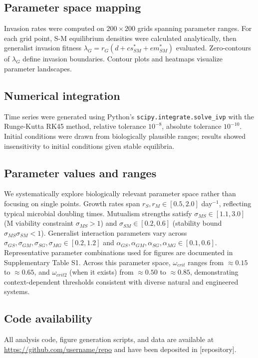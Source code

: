 \documentclass[9pt,twocolumn]{pnas-new}
\begin{document}
\subsection*{Parameter space mapping} Invasion rates were computed on $200 \times 200$ grids spanning parameter ranges. For each grid point, S-M equilibrium densities were calculated analytically, then generalist invasion fitness $\lambda_G = r_G(d + cs^*_{SM} + em^*_{SM})$ evaluated. Zero-contours of $\lambda_G$ define invasion boundaries. Contour plots and heatmaps visualize parameter landscapes.

\subsection*{Numerical integration} Time series were generated using Python's \texttt{scipy.integrate.solve\_ivp} with the Runge-Kutta RK45 method, relative tolerance $10^{-8}$, absolute tolerance $10^{-10}$. Initial conditions were drawn from biologically plausible ranges; results showed insensitivity to initial conditions given stable equilibria.

\subsection*{Parameter values and ranges} We systematically explore biologically relevant parameter space rather than focusing on single points. Growth rates span $r_S, r_M \in [0.5, 2.0]$ day$^{-1}$, reflecting typical microbial doubling times. Mutualism strengths satisfy $\sigma_{MS} \in [1.1, 3.0]$ (M viability constraint $\sigma_{MS} > 1$) and $\sigma_{SM} \in [0.2, 0.6]$ (stability bound $\sigma_{MS}\sigma_{SM} < 1$). Generalist interaction parameters vary across $\sigma_{GS}, \sigma_{GM}, \sigma_{SG}, \sigma_{MG} \in [0.2, 1.2]$ and $\alpha_{GS}, \alpha_{GM}, \alpha_{SG}, \alpha_{MG} \in [0.1, 0.6]$. Representative parameter combinations used for figures are documented in Supplementary Table S1. Across this parameter space, $\omega_{crit}$ ranges from $\approx 0.15$ to $\approx 0.65$, and $\omega_{crit2}$ (when it exists) from $\approx 0.50$ to $\approx 0.85$, demonstrating context-dependent thresholds consistent with diverse natural and engineered systems.

\subsection*{Code availability} All analysis code, figure generation scripts, and data are available at \url{https://github.com/username/repo} and have been deposited in [repository].


\showacknow


\end{document}
